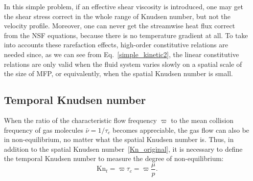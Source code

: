 In this simple problem, if an effective shear viscosity is introduced, one may get the shear stress correct in the whole range of Knudsen number, but not the velocity profile. Moreover, one can never get the streamwise heat flux correct from the NSF equations, because there is no temperature gradient at all. To take into accounts these rarefaction effects, high-order constitutive relations are needed since, as we can see from Eq.~\eqref{simple_kinetic2}, the linear constitutive relations are only valid when the fluid system varies slowly on a spatial scale of the size of MFP, or equivalently, when the spatial Knudsen number is small. 


\subsection{Temporal Knudsen number}

When the ratio of the characteristic flow frequency $\varpi$ to the mean collision frequency of gas molecules $\bar{\nu}=1/\tau_c$ becomes appreciable, the gas flow can also be in non-equilibrium, no matter what the spatial Knudsen number is. Thus, in addition to the spatial Knudsen number~\eqref{Kn_original}, it is necessary to define the temporal Knudsen number to measure the degree of non-equilibrium:
\begin{equation}\label{Kn_temporal}
\text{Kn}_t=\varpi\tau_c=\varpi\frac{\mu}{p}.
\end{equation}



